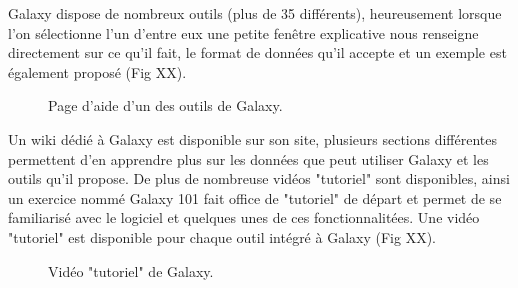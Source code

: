 Galaxy dispose de nombreux outils (plus de 35 différents), heureusement lorsque l'on sélectionne l'un d'entre eux une petite fenêtre explicative nous renseigne directement sur ce qu'il fait, le format de données qu'il accepte et un exemple est également proposé (Fig XX).

\begin{figure}[!h]
 \centering
{}
\caption{Page d'aide d'un des outils de Galaxy.}
\end{figure}

Un wiki dédié à Galaxy est disponible sur son site, plusieurs sections différentes permettent d'en apprendre plus sur les données que peut utiliser Galaxy et les outils qu'il propose. De plus de nombreuse vidéos "tutoriel" sont disponibles, ainsi un exercice nommé Galaxy 101 fait office de "tutoriel" de départ et permet de se familiarisé avec le logiciel et quelques unes de ces fonctionnalitées. Une vidéo "tutoriel" est disponible pour chaque outil intégré à Galaxy (Fig XX).

\begin{figure}[!h]
 \centering
{}
\caption{Vidéo "tutoriel" de Galaxy.}
\end{figure}

